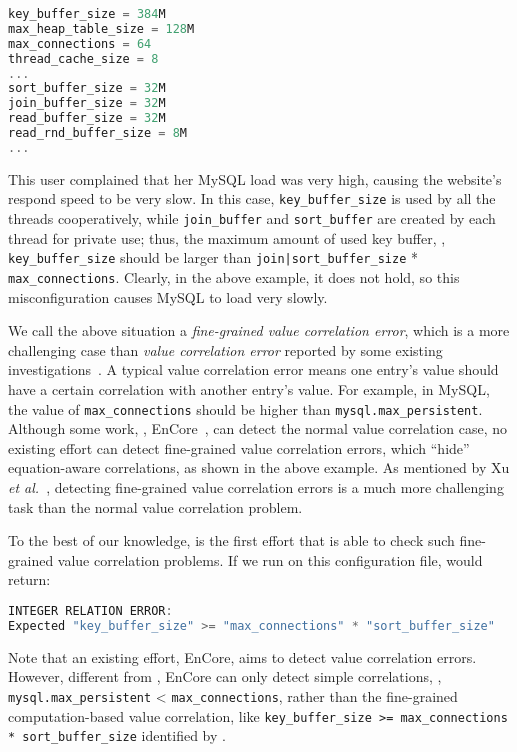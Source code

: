 \begin{lstlisting}[language=C, xleftmargin=.01\textwidth]
key_buffer_size = 384M
max_heap_table_size = 128M
max_connections = 64
thread_cache_size = 8
...
sort_buffer_size = 32M
join_buffer_size = 32M
read_buffer_size = 32M
read_rnd_buffer_size = 8M
...
\end{lstlisting} 

This user complained that her MySQL load was very high, causing the website's
respond speed to be very slow.
In this case, {\tt key\_buffer\_size} is used by all the threads
cooperatively, while {\tt join\_buffer} and {\tt sort\_buffer} are 
created by each thread for private use; thus, the maximum amount
of used key buffer, \ie, {\tt key\_buffer\_size} should be larger than 
{\tt join|sort\_buffer\_size} * {\tt max\_connections}. 
Clearly, in the above example, it does not hold, 
so this misconfiguration causes MySQL to load very slowly.

We call the above situation a {\em fine-grained value correlation
error}, which is a more challenging case than 
{\em value correlation error} reported
by some existing investigations~\cite{yin11anempirical, zhang14encore}.
A typical value correlation error
means one entry's value should have a certain correlation with
another entry's value. For example, in MySQL,
the value of {\tt max\_connections} should be higher than
{\tt mysql.max\_persistent}. Although some work, \eg,
EnCore~\cite{zhang14encore}, can detect the normal value
correlation case, 
no existing effort can detect fine-grained value correlation
errors, which ``hide'' equation-aware correlations, as shown in
the above example.
As mentioned by Xu {\em et al.}~\cite{xu15hey},
detecting fine-grained value correlation errors 
is a much more challenging
task than the normal value correlation problem.

To the best of our knowledge, \app is the first effort that
is able to check such fine-grained value correlation problems.
If we run \app on this configuration file, \app  would return:

\begin{lstlisting}[language=C, xleftmargin=.01\textwidth]
INTEGER RELATION ERROR:
Expected "key_buffer_size" >= "max_connections" * "sort_buffer_size"
\end{lstlisting} 

Note that an existing effort, EnCore, aims to detect value correlation 
errors. However, different from \app, EnCore can only detect simple
correlations, \eg, {\tt mysql.max\_persistent} < {\tt max\_connections},
rather than the fine-grained computation-based value correlation,
like {\tt key\_buffer\_size >= max\_connections * sort\_buffer\_size}
identified by \app.

